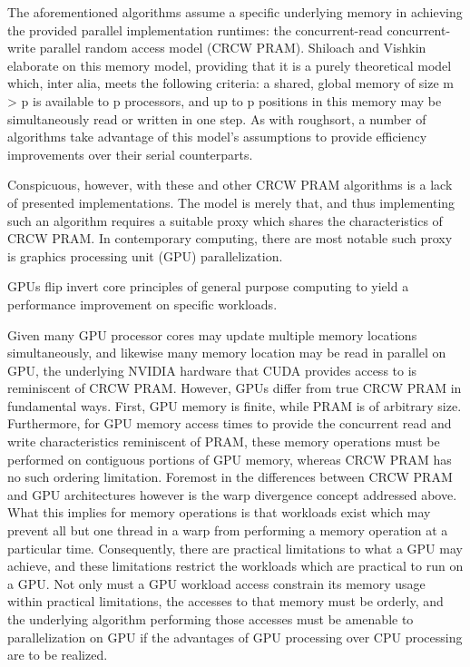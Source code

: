 The aforementioned algorithms assume a specific underlying memory in achieving the provided parallel implementation runtimes: the concurrent-read concurrent-write parallel random access model (CRCW PRAM).  Shiloach and Vishkin elaborate on this memory model, providing that it is a purely theoretical model which, inter alia, meets the following criteria: a shared, global memory of size m > p is available to p processors, and up to p positions in this memory may be simultaneously read or written in one step\cite{Shiloach1981}.  As with roughsort, a number of algorithms take advantage of this model’s assumptions to provide efficiency improvements over their serial counterparts\cite{Shiloach1982}\cite{raj1989}.

Conspicuous, however, with these and other CRCW PRAM algorithms is a lack of presented implementations.  The model is merely that, and thus implementing such an algorithm requires a suitable proxy which shares the characteristics of CRCW PRAM.  In contemporary computing, there are most notable such proxy is graphics processing unit (GPU) parallelization.

GPUs flip invert core principles of general purpose computing to yield a performance improvement on specific workloads.   
	
Given many GPU processor cores may update multiple memory locations simultaneously, and likewise many memory location may be read in parallel on GPU, the underlying NVIDIA hardware that CUDA provides access to is reminiscent of CRCW PRAM.  However, GPUs differ from true CRCW PRAM in fundamental ways.  First, GPU memory is finite, while PRAM is of arbitrary size.  Furthermore, for GPU memory access times to provide the concurrent read and write characteristics reminiscent of PRAM, these memory operations must be performed on contiguous portions of GPU memory, whereas CRCW PRAM has no such ordering limitation.  Foremost in the differences between CRCW PRAM and GPU architectures however is the warp divergence concept addressed above.  What this implies for memory operations is that workloads exist which may prevent all but one thread in a warp from performing a memory operation at a particular time.  Consequently, there are practical limitations to what a GPU may achieve, and these limitations restrict the workloads which are practical to run on a GPU.  Not only must a GPU workload access constrain its memory usage within practical limitations, the accesses to that memory must be orderly, and the underlying algorithm performing those accesses must be amenable to parallelization on GPU if the advantages of GPU processing over CPU processing are to be realized\cite{dehne2010}.
